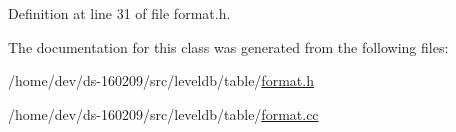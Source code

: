 Definition at line 31 of file format.\+h.



The documentation for this class was generated from the following files\+:\begin{DoxyCompactItemize}
\item 
/home/dev/ds-\/160209/src/leveldb/table/\hyperlink{format_8h}{format.\+h}\item 
/home/dev/ds-\/160209/src/leveldb/table/\hyperlink{format_8cc}{format.\+cc}\end{DoxyCompactItemize}

